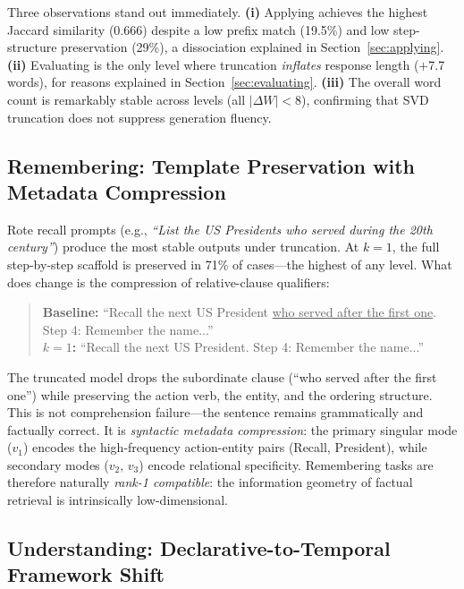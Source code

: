 Three observations stand out immediately.
\textbf{(i)} Applying achieves the highest Jaccard similarity (0.666) despite a low prefix match (19.5\%)
and low step-structure preservation (29\%), a dissociation explained in Section~\ref{sec:applying}.
\textbf{(ii)} Evaluating is the only level where truncation \textit{inflates} response length ($+$7.7 words),
for reasons explained in Section~\ref{sec:evaluating}.
\textbf{(iii)} The overall word count is remarkably stable across levels (all $|\Delta W| < 8$),
confirming that SVD truncation does not suppress generation fluency.

\subsection{Remembering: Template Preservation with Metadata Compression}

Rote recall prompts (e.g., \textit{``List the US Presidents who served during the 20th century''})
produce the most stable outputs under truncation.
At $k=1$, the full step-by-step scaffold is preserved in 71\% of cases---the highest of any level.
What does change is the compression of relative-clause qualifiers:

\begin{quote}
\small
\textbf{Baseline:} ``Recall the next US President \underline{who served after the first one}. Step 4: Remember the name...'' \\
\textbf{$k=1$:} ``Recall the next US President. Step 4: Remember the name...''
\end{quote}

The truncated model drops the subordinate clause (``who served after the first one'') while
preserving the action verb, the entity, and the ordering structure.
This is not comprehension failure---the sentence remains grammatically and factually correct.
It is \textit{syntactic metadata compression}: the primary singular mode ($v_1$) encodes the
high-frequency action-entity pairs (Recall, President), while secondary modes ($v_2,\,v_3$)
encode relational specificity.
Remembering tasks are therefore naturally \emph{rank-1 compatible}: the information geometry
of factual retrieval is intrinsically low-dimensional.

\subsection{Understanding: Declarative-to-Temporal Framework Shift}
\label{sec:understanding}

